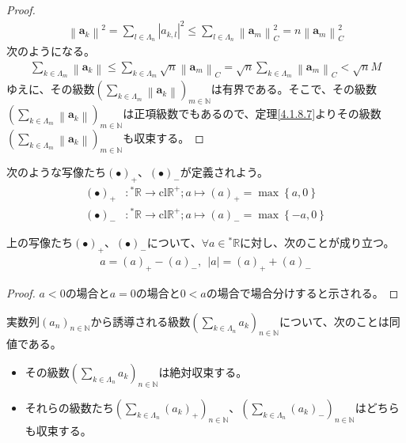 \documentclass[dvipdfmx]{jsarticle}
\begin{document}
\begin{proof}
\begin{align*}
\left\| \mathbf{a}_{k} \right\|^{2} = \sum_{l \in \varLambda_{n}} \left| a_{k,l} \right|^{2} \leq \sum_{l \in \varLambda_{n}} \left\| \mathbf{a}_{m} \right\|_{C}^{2} = n\left\| \mathbf{a}_{m} \right\|_{C}^{2}
\end{align*}
次のようになる。
\begin{align*}
\sum_{k \in \varLambda_{m}} \left\| \mathbf{a}_{k} \right\| \leq \sum_{k \in \varLambda_{m}} {\sqrt{n}\left\| \mathbf{a}_{m} \right\|_{C}} = \sqrt{n}\sum_{k \in \varLambda_{m}} \left\| \mathbf{a}_{m} \right\|_{C} < \sqrt{n}M
\end{align*}
ゆえに、その級数$\left( \sum_{k \in \varLambda_{m}} \left\| \mathbf{a}_{k} \right\| \right)_{m \in \mathbb{N}}$は有界である。そこで、その級数$\left( \sum_{k \in \varLambda_{m}} \left\| \mathbf{a}_{k} \right\| \right)_{m \in \mathbb{N}}$は正項級数でもあるので、定理\ref{4.1.8.7}よりその級数$\left( \sum_{k \in \varLambda_{m}} \left\| \mathbf{a}_{k} \right\| \right)_{m \in \mathbb{N}}$も収束する。
\end{proof}
\begin{dfn}
次のような写像たち$( \bullet )_{+}$、$( \bullet )_{-}$が定義されよう。
\begin{align*}
( \bullet )_{+}&:{}^{*}\mathbb{R} \rightarrow \mathrm{cl}\mathbb{R}^{+};a \mapsto (a)_{+} = \max\left\{ a,0 \right\}\\
( \bullet )_{-}&:{}^{*}\mathbb{R} \rightarrow \mathrm{cl}\mathbb{R}^{+};a \mapsto (a)_{-} = \max\left\{ - a,0 \right\}
\end{align*}
\end{dfn}
\begin{thm}\label{4.1.8.16}
上の写像たち$( \bullet )_{+}$、$( \bullet )_{-}$について、$\forall a \in{}^{*}\mathbb{R}$に対し、次のことが成り立つ。
\begin{align*}
a = (a)_{+} - (a)_{-},\ \ |a| = (a)_{+} + (a)_{-}
\end{align*}
\end{thm}
\begin{proof}
$a < 0$の場合と$a = 0$の場合と$0 < a$の場合で場合分けすると示される。
\end{proof}
\begin{thm}\label{4.1.8.17}
実数列$\left( a_{n} \right)_{n \in \mathbb{N}}$から誘導される級数$\left( \sum_{k \in \varLambda_{n}} a_{k} \right)_{n \in \mathbb{N}}$について、次のことは同値である。
\begin{itemize}
\item
  その級数$\left( \sum_{k \in \varLambda_{n}} a_{k} \right)_{n \in \mathbb{N}}$は絶対収束する。
\item
  それらの級数たち$\left( \sum_{k \in \varLambda_{n}} \left( a_{k} \right)_{+} \right)_{n \in \mathbb{N}}$、$\left( \sum_{k \in \varLambda_{n}} \left( a_{k} \right)_{-} \right)_{n \in \mathbb{N}}$はどちらも収束する。
\end{itemize}
\end{thm}
\end{document}
